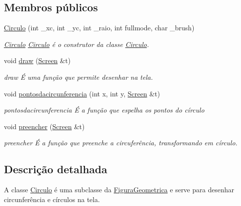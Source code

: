 \subsection*{Membros públicos}
\begin{DoxyCompactItemize}
\item 
\mbox{\hyperlink{class_circulo_a68c5a9226f3a366c5b92fc523e281fac}{Circulo}} (int \+\_\+xc, int \+\_\+yc, int \+\_\+raio, int fullmode, char \+\_\+brush)
\begin{DoxyCompactList}\small\item\em \mbox{\hyperlink{class_circulo}{Circulo}} \mbox{\hyperlink{class_circulo}{Circulo}} é o construtor da classe \mbox{\hyperlink{class_circulo}{Circulo}}. \end{DoxyCompactList}\item 
void \mbox{\hyperlink{class_circulo_a593787d6e0618c2eded23e8839e7bea6}{draw}} (\mbox{\hyperlink{class_screen}{Screen}} \&t)
\begin{DoxyCompactList}\small\item\em draw É uma função que permite desenhar na tela. \end{DoxyCompactList}\item 
void \mbox{\hyperlink{class_circulo_ae6d005ce309278d2f2ca170fdfa64e0a}{pontosdacircunferencia}} (int x, int y, \mbox{\hyperlink{class_screen}{Screen}} \&t)
\begin{DoxyCompactList}\small\item\em pontosdacircunferencia É a função que espelha os pontos do círculo \end{DoxyCompactList}\item 
void \mbox{\hyperlink{class_circulo_a4f0f6781f9ec3f501539f28a7788e9f1}{preencher}} (\mbox{\hyperlink{class_screen}{Screen}} \&t)
\begin{DoxyCompactList}\small\item\em preencher É a função que preenche a circuferência, transformando em círculo. \end{DoxyCompactList}\end{DoxyCompactItemize}


\subsection{Descrição detalhada}
A classe \mbox{\hyperlink{class_circulo}{Circulo}} é uma subclasse da \mbox{\hyperlink{class_figura_geometrica}{Figura\+Geometrica}} e serve para desenhar circunferência e círculos na tela. 

